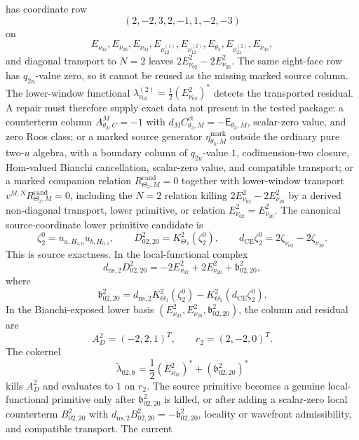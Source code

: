 \begin{enumerate}
  has
  coordinate row
  \[
    (2,-2,3,2,-1,1,-2,-3)
  \]
  on
  \[
    E_{\nu_{02}},E_{\nu_{20}},E_{\nu_{03}},
    E_{\nu_{12}^{(1)}},E_{\nu_{12}^{(2)}},
    E_{\theta_3},E_{\nu_{21}^{(2)}},E_{\nu_{30}},
  \]
  and diagonal transport to \(N=2\) leaves
  \(2E^2_{\nu_{02}}-2E^2_{\nu_{20}}\).  The same eight-face row has
  \(q_{2u}\)-value zero, so it cannot be reused as the missing marked
  source column.  The lower-window functional
  \(\lambda^{(2)}_{\nu_{02}}=\frac12(E^2_{\nu_{02}})^*\) detects the
  transported residual.  A repair must therefore supply exact data not
  present in the tested package: a counterterm column
  \(A^M_{\theta_3,C}=-1\) with
  \(d_MC^{\mathrm{ct}}_{\theta_3,M}=-\mathsf E_{\theta_3,M}\),
  scalar-zero value, and zero Roos class; or a marked source generator
  \(\eta^{\mathrm{mark}}_{\theta_3,M}\) outside the ordinary pure
  two-\(u\) algebra, with a boundary column of \(q_{2u}\)-value \(1\),
  codimension-two closure, Hom-valued Bianchi cancellation, scalar-zero
  value, and compatible transport; or a marked companion relation
  \(R^{\mathrm{cand}}_{\Theta_3,M}=0\) together with lower-window
  transport \(v^{M,N}R^{\mathrm{cand}}_{\Theta_3,M}=0\), including the
  \(N=2\) relation killing
  \(2E^2_{\nu_{02}}-2E^2_{\nu_{20}}\) by a derived non-diagonal
  transport, lower primitive, or relation
  \(E^2_{\nu_{02}}=E^2_{\nu_{20}}\).  The canonical source-coordinate
  lower primitive candidate is
  \[
    \zeta^0_2=u_{a,H_{1,0}}u_{b,H_{0,1}},\qquad
    D^2_{02,20}=K^2_{\Theta_3}(\zeta^0_2),
    \qquad
    d_{\mathrm{CE}}\zeta^0_2
    =
    2\zeta_{\nu_{02}}-2\zeta_{\nu_{20}}.
  \]
  This is source exactness.  In the local-functional complex
  \[
    d_{\mathrm{ns},2}D^2_{02,20}
    =
    -2E^2_{\nu_{02}}+2E^2_{\nu_{20}}
    +\mathfrak b^2_{02,20},
  \]
  where
  \[
    \mathfrak b^2_{02,20}
    =
    d_{\mathrm{ns},2}K^2_{\Theta_3}(\zeta^0_2)
    -
    K^2_{\Theta_3}(d_{\mathrm{CE}}\zeta^0_2).
  \]
  In the Bianchi-exposed lower basis
  \((E^2_{\nu_{02}},E^2_{\nu_{20}},\mathfrak b^2_{02,20})\), the column
  and residual are
  \[
    A_D^2=(-2,2,1)^T,\qquad r_2=(2,-2,0)^T .
  \]
  The cokernel
  \[
    \widetilde\lambda_{02,\mathfrak b}
    =
    \frac12(E^2_{\nu_{02}})^*
    +(\mathfrak b^2_{02,20})^*
  \]
  kills \(A_D^2\) and evaluates to \(1\) on \(r_2\).  The source
  primitive becomes a genuine local-functional primitive only after
  \(\mathfrak b^2_{02,20}\) is killed, or after adding a scalar-zero local
  counterterm \(B^2_{02,20}\) with
  \(d_{\mathrm{ns},2}B^2_{02,20}=-\mathfrak b^2_{02,20}\), locality or
  wavefront admissibility, and compatible transport.  The current

\end{enumerate}
